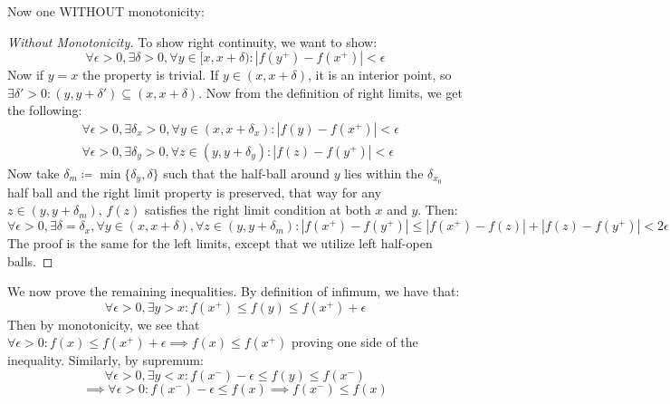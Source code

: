 \documentclass[10pt,letterpaper]{article} %
\begin{document}
Now one WITHOUT monotonicity:
\begin{proof}[Without Monotonicity]
To show right continuity, we want to show:
\begin{equation*}
\forall \epsilon > 0, \exists \delta > 0, \forall y \in [x, x+\delta): |f(y^+) - f(x^+)| < \epsilon
\end{equation*}
Now if $y = x$ the property is trivial. If $y \in (x, x + \delta)$, it is an interior point, so $\exists \delta' > 0: (y, y + \delta') \subseteq (x, x+\delta)$. Now from the definition of right limits, we get the following:
\begin{align*}
&\forall \epsilon > 0, \exists \delta_{x} > 0, \forall y \in (x, x+\delta_{x}): |f(y) - f(x^+)| < \epsilon\\
&\forall \epsilon > 0, \exists \delta_y > 0, \forall z \in (y, y+\delta_y): |f(z) - f(y^+)| < \epsilon
\end{align*}
Now take $\delta_{m} \coloneq \min\{\delta_y, \delta\}$ such that the half-ball around $y$ lies within the $\delta_{x_0}$ half ball and the right limit property is preserved, that way for any $z \in (y, y+\delta_m)$, $f(z)$ satisfies the right limit condition at both $x$ and $y$. Then:
\begin{equation*}
\forall \epsilon > 0, \exists \delta = \delta_{x}, \forall y \in (x, x + \delta), \forall z \in (y, y+\delta_m): |f(x^+) - f(y^+)| \leqslant |f(x^+) - f(z)| + |f(z) - f(y^+)| < 2\epsilon
\end{equation*}
The proof is the same for the left limits, except that we utilize left half-open balls.
\end{proof}

We now prove the remaining inequalities. By definition of infimum, we have that:
\begin{equation*}
\forall \epsilon > 0, \exists y > x: f(x^+) \leqslant f(y) \leqslant f(x^+) + \epsilon
\end{equation*}
Then by monotonicity, we see that $\forall \epsilon > 0: f(x) \leqslant f(x^+) + \epsilon \implies f(x) \leqslant f(x^+)$ proving one side of the inequality. Similarly, by supremum:
\begin{equation*}
\forall \epsilon > 0, \exists y < x: f(x^-) - \epsilon \leqslant f(y) \leqslant f(x^-)
\end{equation*}
\begin{equation*}
\implies \forall \epsilon > 0: f(x^-) - \epsilon \leqslant f(x) \implies f(x^-) \leqslant f(x)
\end{equation*}
\end{document}
